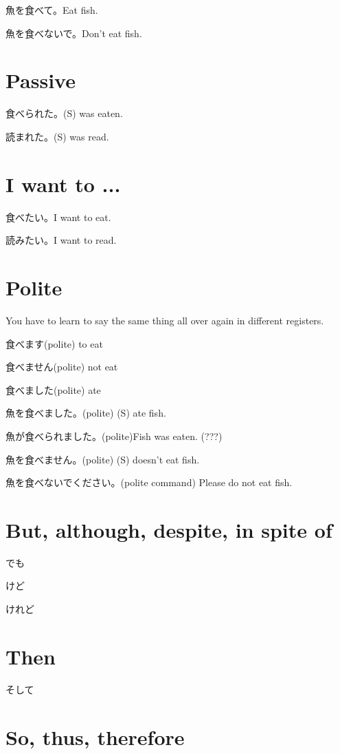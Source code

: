 魚を食べて。Eat fish.

魚を食べないで。Don't eat fish.

\section{Passive}

食べられた。(S) was eaten.

読まれた。(S) was read.

\section{I want to ...}

食べたい。I want to eat.

読みたい。I want to read.

\section{Polite}

You have to learn to say the same thing all over again in different registers.

食べます(polite) to eat

食べません(polite) not eat

食べました(polite) ate

魚を食べました。(polite) (S) ate fish.

魚が食べられました。(polite)Fish was eaten. (???)

魚を食べません。(polite) (S) doesn't eat fish.

魚を食べないでください。(polite command) Please do not eat fish.

\section{But, although, despite, in spite of}

でも

けど

けれど

\section{Then}

そして

\section{So, thus, therefore}

